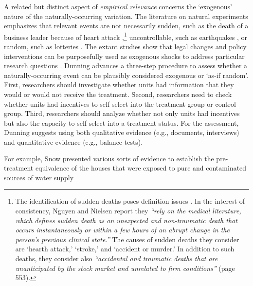 \documentclass[11pt]{article}
\begin{document}
\begin{refsection}
A related but distinct aspect of \textit{empirical relevance} concerns the
`exogenous' nature of the naturally-occurring variation. The literature on
natural experiments emphasizes that relevant events are not necessarily sudden,
such as the death of a business leader because of heart attack
\autocite[e.g.,][]{nguyen_et_al_2010},\footnote{The identification of sudden
deaths poses definition issues
\autocite[e.g.,][]{azoulay_et_al_2010,oettl_2012}.  In the interest of
consistency, Nguyen and Nielsen \autocite*{nguyen_et_al_2010} report they
\textit{``rely on the medical literature, which defines sudden death as an
unexpected and non-traumatic death that occurs instantaneously or within a few
hours of an abrupt change in the person’s previous clinical state.''} The causes
of sudden deaths they consider are `hearth attack,' `stroke,' and `accident or
murder.' In addition to such deaths, they consider also \textit{``accidental and
traumatic deaths that are unanticipated by the stock market and unrelated to
firm conditions''} (page 553). } uncontrollable, such as earthquakes
\autocite[e.g.,][]{belloc_et_al_2016}, or random, such as lotteries
\autocite[e.g.,][]{poulos_2019}. The extant studies show that legal changes and
policy interventions can be purposefully used as exogenous shocks to address
particular research questions \autocites[e.g.,][]{beaman_et_al_2012,
matsa_miller_2013,chauchard_2014}. Dunning \autocite*[][page 236]{dunning_2012}
advances a three-step procedure to assess whether a naturally-occurring event
can be plausibly considered exogenous or `as-if random'. First, researchers
should investigate whether units had information that they would or would not
receive the treatment. Second, researchers need to check whether units had
incentives to self-select into the treatment group or control group. Third,
researchers should analyze whether not only units had incentives but also the
capacity to self-select into a treatment status. For the assessment, Dunning
\autocite*{dunning_2012} suggests using both qualitative evidence (e.g.,
documents, interviews) and quantitative evidence (e.g., balance tests).

For example, Snow \autocite*{snow_1855} presented various sorts of evidence to
establish the pre-treatment equivalence of the houses that were exposed to pure
and contaminated sources of water supply


\end{refsection}
\end{document}
